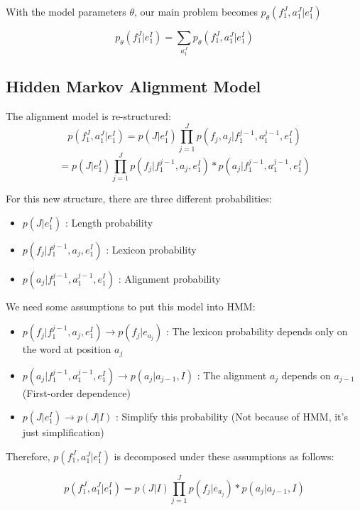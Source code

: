 \documentclass{article}
\begin{document}
With the model parameters $\theta$, our main problem becomes $p_{\theta}(f_1^J, a_1^J|e_1^I)$

\begin{equation}
p_{\theta}(f_1^J|e_1^I) = \sum_{a_1^J} p_{\theta}(f_1^J, a_1^J|e_1^I)
\label{Overview about Statistical Alignment p(f,e)}
\end{equation}


\subsection{Hidden Markov Alignment Model \cite{Och2003Systematic}}
The alignment model is re-structured:
\begin{equation}
p(f_1^J, a_1^J|e_1^I) = p(J|e_1^I) \prod_{j=1}^J p(f_j, a_j | f_1^{j-1}, a_1^{j-1}, e_1^I)
\end{equation}
\begin{equation}
= p(J|e_1^I) \prod_{j=1}^J p( f_j | f_1^{j-1}, a_j, e_1^I) * p( a_j | f_1^{j-1}, a_1^{j-1}, e_1^I)
\end{equation}

For this new structure, there are three different probabilities:
\begin{itemize}
\item $p(J|e_1^I)$ : Length probability
\item $p( f_j | f_1^{j-1}, a_j, e_1^I)$ : Lexicon  probability
\item $p( a_j | f_1^{j-1}, a_1^{j-1}, e_1^I)$ : Alignment probability
\end{itemize}

We need some assumptions to put this model into HMM:
\begin{itemize}
\item $p( f_j | f_1^{j-1}, a_j, e_1^I) \rightarrow p(f_j | e_{a_j}) $ : The lexicon probability depends only on the word at position $a_j$
\item $p( a_j | f_1^{j-1}, a_1^{j-1}, e_1^I) \rightarrow p(a_j | a_{j-1}, I) $ : The alignment $a_j$ depends on $a_{j - 1}$  (First-order dependence)
\item $p(J|e_1^I) \rightarrow p(J|I)$ : Simplify this probability (Not because of HMM, it's just simplification)
\end{itemize}

Therefore, $p(f_1^J, a_1^J|e_1^I)$ is decomposed under these assumptions as follows:

\begin{equation}
p(f_1^J, a_1^J|e_1^I) = p(J|I) \prod_{j=1}^J p(f_j | e_{a_j}) * p(a_j | a_{j-1}, I)
\label{Och2003Systematic Alignment Model Equation}
\end{equation}
\end{document}
